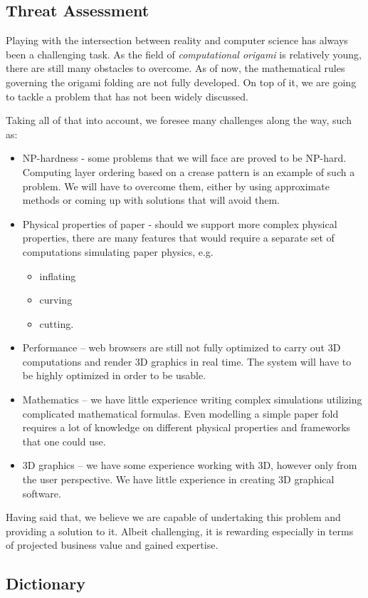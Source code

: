 \subsection{Threat Assessment}

Playing with the intersection between reality and computer science has always been a challenging task.
As the field of \textit{computational origami} is relatively young\cite{recent-results-in-computational-origami:paper}, there are still many obstacles to overcome.
As of now, the mathematical rules governing the origami folding are not fully developed.
On top of it, we are going to tackle a problem that has not been widely discussed.

Taking all of that into account, we foresee many challenges along the way, such as:

\begin{itemize}
	\item NP-hardness - some problems that we will face are proved to be NP-hard.
		Computing layer ordering based on a crease pattern is an example of such a problem.
		We will have to overcome them, either by using approximate methods or coming up with solutions that will avoid them.

	\item Physical properties of paper - should we support more complex physical properties,
		there are many features that would require a separate set of computations simulating paper physics, e.g.
		\begin{itemize}
			\item inflating
			\item curving
			\item cutting.
		\end{itemize}

	\item Performance -- web browsers are still not fully optimized to carry out 3D computations and render 3D graphics in real time.
		The system will have to be highly optimized in order to be usable.
		
	\item Mathematics -- we have little experience writing complex simulations utilizing complicated mathematical formulas.
		Even modelling a simple paper fold requires a lot of knowledge on different physical properties and frameworks that one could use.

	\item 3D graphics -- we have some experience working with 3D, however only from the user perspective.
		We have little experience in creating 3D graphical software.

\end{itemize}

Having said that, we believe we are capable of undertaking this problem and providing a solution to it.
Albeit challenging, it is rewarding especially in terms of projected business value and gained expertise.

\subsection{Dictionary}\label{dictionary}



